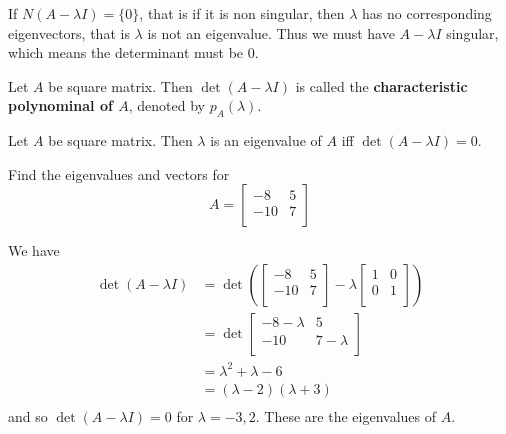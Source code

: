\documentclass{article}
\begin{document}
\begin{remark}
  If $N(A - \lambda I) = \{0\}$, that is if it is non singular, then $\lambda$ has no corresponding eigenvectors, that is $\lambda$ is not an eigenvalue. Thus we must have $A - \lambda I$ singular, which means the determinant must be $0$.
\end{remark}
\begin{definition}
  Let $A$ be square matrix. Then $\det (A - \lambda I)$ is called the \textbf{characteristic polynominal of $A$}, denoted by $p_A(\lambda)$.
\end{definition}
\begin{theorem}
  Let $A$ be square matrix. Then $\lambda$ is an eigenvalue of $A$ iff $\det(A - \lambda I) = 0$.
\end{theorem}
\begin{example}
  Find the eigenvalues and vectors for \[
    A =
    \begin{bmatrix}
      -8 & 5\\
      -10 & 7\\
    \end{bmatrix}
  \]

  We have
  \begin{align*}
    \det (A - \lambda I) &= \det \left(
      \begin{bmatrix}
        -8 & 5\\
        -10 & 7\\
      \end{bmatrix} - \lambda
      \begin{bmatrix}
        1 & 0\\
        0 & 1\\
    \end{bmatrix}\right)\\
    &= \det
    \begin{bmatrix}
      -8 - \lambda & 5\\
      -10 & 7 - \lambda\\
    \end{bmatrix}\\
    &= \lambda^2 + \lambda - 6\\
    &= (\lambda - 2)(\lambda + 3)\\
  \end{align*}
  and so $\det(A - \lambda I) = 0$ for $\lambda = -3, 2$. These are the eigenvalues of $A$.


\end{example}
\end{document}
